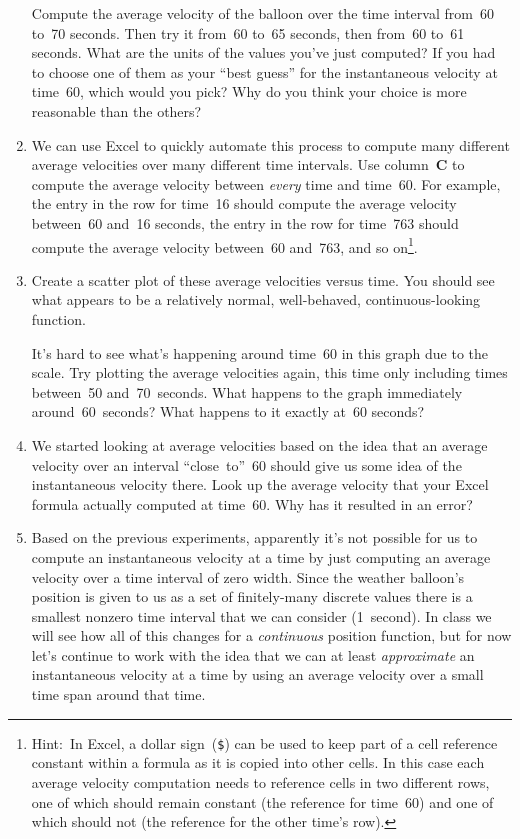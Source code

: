 \begin{enumerate}
	Compute the average velocity of the balloon over the time interval from~60 to~70 seconds. Then try it from~60 to~65 seconds, then from~60 to~61 seconds. What are the units of the values you've just computed? If you had to choose one of them as your ``best guess'' for the instantaneous velocity at time~60, which would you pick? Why do you think your choice is more reasonable than the others?
	
	\item We can use Excel to quickly automate this process to compute many different average velocities over many different time intervals. Use column~\textbf{C} to compute the average velocity between \textit{every} time and time~60. For example, the entry in the row for time~16 should compute the average velocity between~60 and~16 seconds, the entry in the row for time~763 should compute the average velocity between~60 and~763, and so on\footnote{Hint:~In Excel, a dollar sign~(\texttt{\$}) can be used to keep part of a cell reference constant within a formula as it is copied into other cells. In this case each average velocity computation needs to reference cells in two different rows, one of which should remain constant (the reference for time~60) and one of which should not (the reference for the other time's row).}.
	
	\item Create a scatter plot of these average velocities versus time. You should see what appears to be a relatively normal, well-behaved, continuous-looking function.
	
	It's hard to see what's happening around time~60 in this graph due to the scale. Try plotting the average velocities again, this time only including times between~50 and~70~seconds. What happens to the graph immediately around~60~seconds? What happens to it exactly at~60 seconds?
	
	\item We started looking at average velocities based on the idea that an average velocity over an interval ``close~to''~60 should give us some idea of the instantaneous velocity there. Look up the average velocity that your Excel formula actually computed at time~60. Why has it resulted in an error?
	
	\item Based on the previous experiments, apparently it's not possible for us to compute an instantaneous velocity at a time by just computing an average velocity over a time interval of zero width. Since the weather balloon's position is given to us as a set of finitely-many discrete values there is a smallest nonzero time interval that we can consider (1~second). In class we will see how all of this changes for a \textit{continuous} position function, but for now let's continue to work with the idea that we can at least \textit{approximate} an instantaneous velocity at a time by using an average velocity over a small time span around that time.
	

\end{enumerate}
